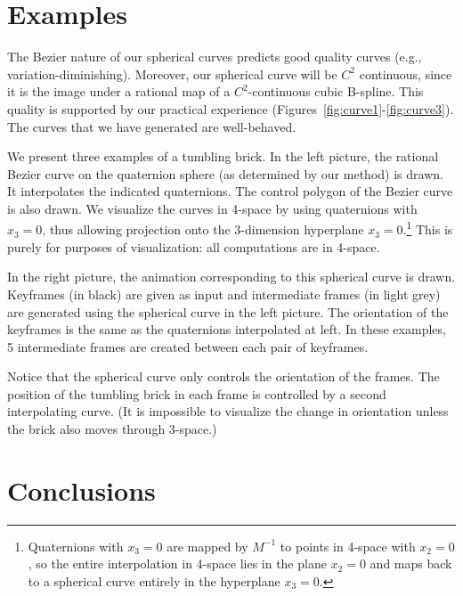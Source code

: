 \section{Examples}
\label{sec:eg}

The Bezier nature of our spherical curves predicts good quality curves
(e.g., variation-diminishing).
Moreover, our spherical curve will be $C^2$ continuous, since it is the image
under a rational map of a $C^2$-continuous cubic B-spline.
This quality is supported by our practical experience
(Figures~\ref{fig:curve1}-\ref{fig:curve3}).
The curves that we have generated are well-behaved.

We present three examples of a tumbling brick.
In the left picture, the rational Bezier curve on the quaternion sphere
(as determined by our method) is drawn.
It interpolates the indicated quaternions.
The control polygon of the Bezier curve is also drawn.
We visualize the curves in 4-space by using quaternions with $x_3=0$,
thus allowing projection onto the 3-dimension hyperplane 
$x_3=0$.\footnote{Quaternions with $x_3=0$ are mapped by $M^{-1}$ to points
	in 4-space with $x_2=0$, so the entire interpolation in 4-space
	lies in the plane $x_2=0$ and maps back to a spherical curve
	entirely in the hyperplane $x_3=0$.}
This is purely for purposes of visualization: all computations
are in 4-space.

In the right picture, the animation corresponding to this spherical
curve is drawn.
Keyframes (in black) are given as input
and intermediate frames (in light grey) 
are generated using the spherical curve in the left picture.
The orientation of the keyframes is the same as the quaternions
interpolated at left.
In these examples, 5 intermediate frames are created between 
each pair of keyframes.

Notice that the spherical curve only controls the orientation of the frames.
The position of the tumbling brick in
each frame is controlled by a second interpolating curve.
(It is impossible to visualize the change in orientation unless
the brick also moves through 3-space.)


\section{Conclusions}
\label{sec:finito}

